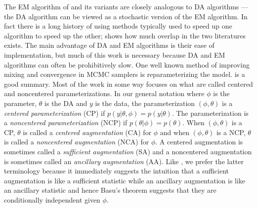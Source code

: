 \documentclass{article}
\begin{document}
The EM algorithm of  and its variants are closely analogous to DA algorithms --- the DA algorithm can be viewed as a stochastic version of the EM algorithm. In fact there is a long history of using methods typically used to speed up one algorithm to speed up the other;  shows how much overlap in the two literatures exists. The main advantage of DA and EM algorithms is their ease of implementation, but much of this work is necessary because DA and EM algorithms can often be prohibitively slow. One well known method of improving mixing and convergence in MCMC samplers is reparameterizing the model.  is a good summary. Most of the work in some way focuses on what are called centered and noncentered parameterizations. In our general notation where $\phi$ is the parameter, $\theta$ is the DA and $y$ is the data, the parameterization $(\phi,\theta)$ is a {\it centered parameterization} (CP) if $p(y|\theta,\phi)=p(y|\theta)$. The parameterization is a {\it noncentered parameterization} (NCP) if $p(\theta|\phi)=p(\theta)$. When $(\phi,\theta)$ is a CP, $\theta$ is called a {\it centered augmentation} (CA) for $\phi$ and when $(\phi,\theta)$ is a NCP, $\theta$ is called a {\it noncentered augmentation} (NCA) for $\phi$. A centered augmentation is sometimes called a {\it sufficient augmentation} (SA) and a noncentered augmentation is sometimes called an {\it ancillary augmentation} (AA)\cite{yu2011center}. Like , we prefer the latter terminology because it immediately suggests the intuition that a sufficient augmentation is like a sufficient statistic while an ancillary augmentation is like an ancillary statistic and hence Basu's theorem suggests that they are conditionally independent given $\phi$. 
\end{document}
